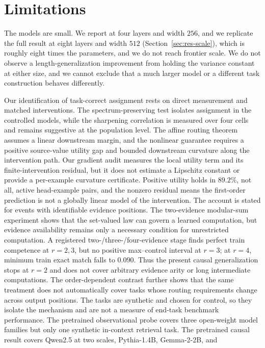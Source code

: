 \documentclass[letterpaper]{article} %
\begin{document}
\section{Limitations}
\label{sec:limitations}

The models are small.
We report at four layers and width $256$, and we replicate the full result at eight layers and width $512$
(Section~\ref{sec:res-scale}), which is roughly eight times the parameters, and we do not reach frontier
scale.
We do not observe a length-generalization improvement from holding the variance constant at either size,
and we cannot exclude that a much larger model or a different task construction behaves differently.

Our identification of task-correct assignment rests on direct measurement and matched interventions.
The spectrum-preserving test isolates assignment in the controlled models, while the sharpening correlation
is measured over four cells and remains suggestive at the population level.
The affine routing theorem assumes a linear downstream margin, and the nonlinear guarantee requires a
positive source-value utility gap and bounded downstream curvature along the intervention path.
Our gradient audit measures the local utility term and its finite-intervention residual, but it does not
estimate a Lipschitz constant or provide a per-example curvature certificate.
Positive utility holds in $89.2\%$, not all, active head-example pairs, and the nonzero residual means the
first-order prediction is not a globally linear model of the intervention.
The account is stated for events with identifiable evidence positions.
The two-evidence modular-sum experiment shows that the set-valued law can govern a learned computation, but
evidence availability remains only a necessary condition for unrestricted computation. A registered
two-/three-/four-evidence stage finds perfect train competence at $r=2,3$, but no positive max--control
interval at $r=3$; at $r=4$, minimum train exact match falls to $0.090$. Thus the present causal
generalization stops at $r=2$ and does not cover arbitrary evidence arity or long intermediate computations.
The order-dependent contrast further shows that the same treatment does not automatically cover tasks
whose routing requirements change across output positions.
The tasks are synthetic and chosen for control, so they isolate the mechanism and are not a measure of
end-task benchmark performance.
The pretrained observational probe covers three open-weight model families but only one synthetic in-context
retrieval task. The pretrained causal result covers Qwen2.5 at two scales, Pythia-1.4B, Gemma-2-2B, and
\end{document}
